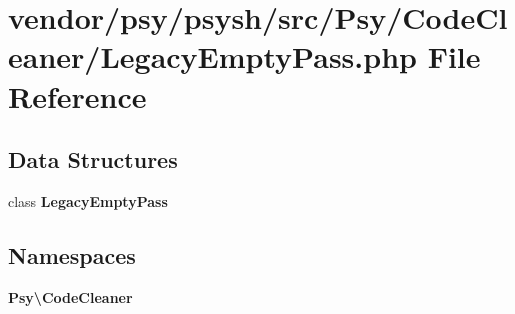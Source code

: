 \section{vendor/psy/psysh/src/\+Psy/\+Code\+Cleaner/\+Legacy\+Empty\+Pass.php File Reference}
\label{_legacy_empty_pass_8php}
\subsection*{Data Structures}
\begin{DoxyCompactItemize}
\item 
class {\bf Legacy\+Empty\+Pass}
\end{DoxyCompactItemize}
\subsection*{Namespaces}
\begin{DoxyCompactItemize}
\item 
 {\bf Psy\textbackslash{}\+Code\+Cleaner}
\end{DoxyCompactItemize}
